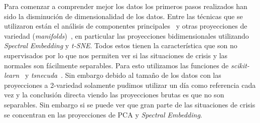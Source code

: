
Para comenzar a comprender mejor los datos los primeros pasos realizados han sido la disminución de dimensionalidad de los datos. Entre las técnicas que se utilizaron están el análisis de componentes principales~\cite{wiki:pca} y otras proyecciones de variedad (\textit{manifolds})~\cite{wiki:manifold}, en particular las proyecciones bidimensionales utilizando \textit{Spectral Embedding} y \textit{t-SNE}. Todos estos tienen la característica que son no supervisados por lo que nos permiten ver si las situaciones de crisis y las normales son fácilmente separables. Para esto utilizamos las funciones de \textit{scikit-learn}~\cite{tool:scikit-learn} y \textit{tsnecuda}~\cite{tool:tsnecuda}. Sin embargo debido al tamaño de los datos con las proyecciones a 2-variedad solamente pudimos utilizar un día como referencia cada vez y la conclusión directa viendo las proyecciones brutas es que no son separables. Sin embargo si se puede ver que gran parte de las situaciones de crisis se concentran en las proyecciones de PCA y \textit{Spectral Embedding}.


